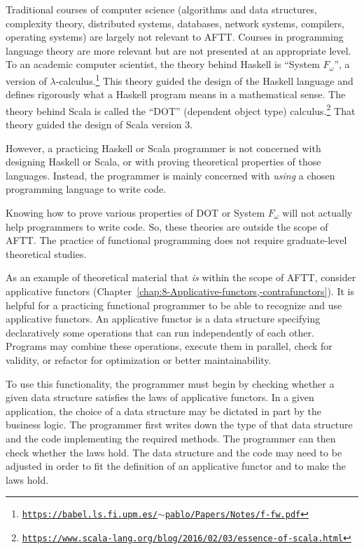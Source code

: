 Traditional courses of computer science (algorithms and data structures,
complexity theory, distributed systems, databases, network systems,
compilers, operating systems) are largely not relevant to AFTT. Courses
in programming language theory are more relevant but are not presented
at an appropriate level. To an academic computer scientist, the theory
behind Haskell is \textsf{``}System $F_{\omega}$\textsf{''}, a version of $\lambda$-calculus.\footnote{\texttt{\href{https://babel.ls.fi.upm.es/~pablo/Papers/Notes/f-fw.pdf}{https://babel.ls.fi.upm.es/$\sim$pablo/Papers/Notes/f-fw.pdf}}}
This theory guided the design of the Haskell language and defines
rigorously what a Haskell program means in a mathematical sense. The
theory behind Scala is called the \textsf{``}DOT\textsf{''} (dependent object type)
calculus.\footnote{\texttt{\href{https://www.scala-lang.org/blog/2016/02/03/essence-of-scala.html}{https://www.scala-lang.org/blog/2016/02/03/essence-of-scala.html}}}
That theory guided the design of Scala version 3.

However, a practicing Haskell or Scala programmer is not concerned
with designing Haskell or Scala, or with proving theoretical properties
of those languages. Instead, the programmer is mainly concerned with
\emph{using} a chosen programming language to write code. 

Knowing how to prove various properties of DOT or System $F_{\omega}$
will not actually help programmers to write code. So, these theories
are outside the scope of AFTT. The practice of functional programming
does not require graduate-level theoretical studies.

As an example of theoretical material that \emph{is} within the scope
of AFTT, consider applicative functors (Chapter~\ref{chap:8-Applicative-functors,-contrafunctors}).
It is helpful for a practicing functional programmer to be able to
recognize and use applicative functors. An applicative functor is
a data structure specifying declaratively some operations that can
run independently of each other. Programs may combine these operations,
execute them in parallel, check for validity, or refactor for optimization
or better maintainability.

To use this functionality, the programmer must begin by checking whether
a given data structure satisfies the laws of applicative functors.
In a given application, the choice of a data structure may be dictated
in part by the business logic. The programmer first writes down the
type of that data structure and the code implementing the required
methods. The programmer can then check whether the laws hold. The
data structure and the code may need to be adjusted in order to fit
the definition of an applicative functor and to make the laws hold.


